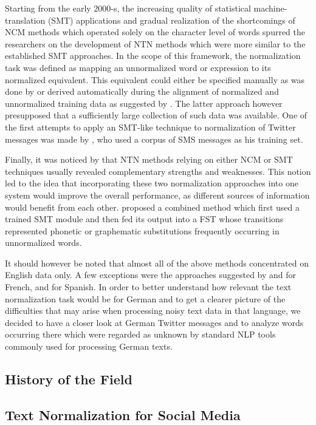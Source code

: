 Starting from the early 2000-s, the increasing quality of statistical
machine-translation (SMT) applications and gradual realization of the
shortcomings of NCM methods which operated solely on the character
level of words spurred the researchers on the development of NTN
methods which were more similar to the established SMT approaches. In
the scope of this framework, the normalization task was defined as
mapping an unnormalized word or expression to its normalized
equivalent. This equivalent could either be specified manually as was
done by \citet{Clark:11} or derived automatically during the
alignment of normalized and unnormalized training data as suggested by
\citet{Aw:06}. The latter approach however presupposed that a
sufficiently large collection of such data was available. One of the
first attempts to apply an SMT-like technique to normalization of
Twitter messages was made by \citet{kaufmann}, who used a corpus of
SMS messages as his training set.

Finally, it was noticed by \citet{Kobus:08} that NTN methods relying on
either NCM or SMT techniques usually revealed complementary strengths
and weaknesses. This notion led to the idea that incorporating these
two normalization approaches into one system would improve the overall
performance, as different sources of information would benefit from
each other. \citet{Kobus:08} proposed a combined method which first used
a trained SMT module and then fed its output into a FST whose
transitions represented phonetic or graphematic substitutions
frequently occurring in unnormalized words.

It should however be noted that almost all of the above methods
concentrated on English data only. A few exceptions were the
approaches suggested by \citet{Beaufort:10} and \citet{Kobus:08} for
French, and \citet{oliva} for Spanish. In order to better understand
how relevant the text normalization task would be for German and to
get a clearer picture of the difficulties that may arise when
processing noisy text data in that language, we decided to have a
closer look at German Twitter messages and to analyze words occurring
there which were regarded as unknown by standard NLP tools commonly
used for processing German texts.

\subsection{History of the Field}
\subsection{Text Normalization for Social Media}
